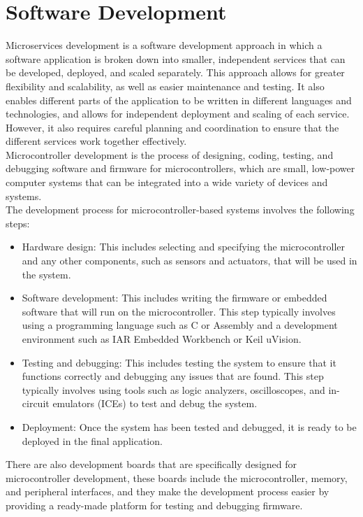 \section{Software Development}
Microservices development is a software development approach in which a software application is broken down into smaller, independent services that can be developed, deployed, and scaled separately. This approach allows for greater flexibility and scalability, as well as easier maintenance and testing. It also enables different parts of the application to be written in different languages and technologies, and allows for independent deployment and scaling of each service. However, it also requires careful planning and coordination to ensure that the different services work together effectively.\vspace{5mm} \\
Microcontroller development is the process of designing, coding, testing, and debugging software and firmware for microcontrollers, which are small, low-power computer systems that can be integrated into a wide variety of devices and systems.\vspace{5mm} \\
The development process for microcontroller-based systems involves the following steps:
\begin{itemize}
\item Hardware design: This includes selecting and specifying the microcontroller and any other components, such as sensors and actuators, that will be used in the system.
\item Software development: This includes writing the firmware or embedded software that will run on the microcontroller. This step typically involves using a programming language such as C or Assembly and a development environment such as IAR Embedded Workbench or Keil uVision.
\item Testing and debugging: This includes testing the system to ensure that it functions correctly and debugging any issues that are found. This step typically involves using tools such as logic analyzers, oscilloscopes, and in-circuit emulators (ICEs) to test and debug the system.
\item Deployment: Once the system has been tested and debugged, it is ready to be deployed in the final application.
\end{itemize}
There are also development boards that are specifically designed for microcontroller development, these boards include the microcontroller, memory, and peripheral interfaces, and they make the development process easier by providing a ready-made platform for testing and debugging firmware.

